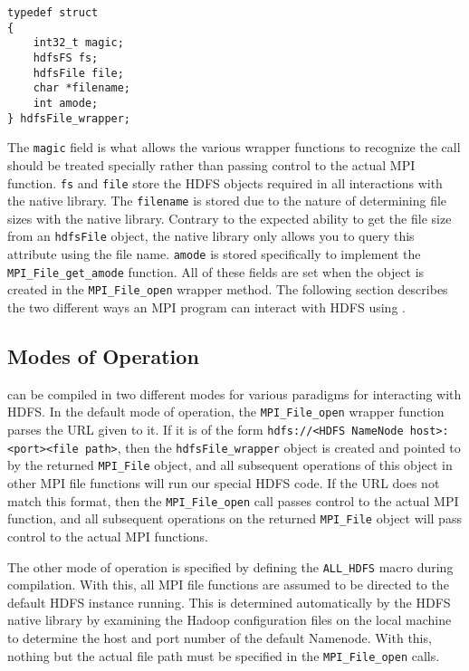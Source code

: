 \begin{lstlisting}
typedef struct
{
	int32_t magic;
	hdfsFS fs;
	hdfsFile file;
	char *filename;
	int amode;
} hdfsFile_wrapper;
\end{lstlisting}

The \texttt{magic} field is what allows the various wrapper functions to
recognize the call should be treated specially rather than passing control to
the actual MPI function. \texttt{fs} and \texttt{file} store the HDFS objects
required in all interactions with the native library. The \texttt{filename} is
stored due to the nature of determining file sizes with the native library.
Contrary to the expected ability to get the file size from an \texttt{hdfsFile}
object, the native library only allows you to query this attribute using the
file name. \texttt{amode} is stored specifically to implement the
\texttt{MPI\_File\_get\_amode} function. All of these fields are set when the
object is created in the \texttt{MPI\_File\_open} wrapper method. The following
section describes the two different ways an MPI program can interact with HDFS using {\proj}.

\subsection{Modes of Operation}
{\proj} can be compiled in two different modes for various paradigms for
interacting with HDFS. In the default mode of operation, the
\texttt{MPI\_File\_open} wrapper function parses the URL given to it. If it is
of the form \texttt{hdfs://<HDFS NameNode host>:<port><file path>}, then the
\texttt{hdfsFile\_wrapper} object is created and pointed to by the returned
\texttt{MPI\_File} object, and all subsequent operations of this object in other
MPI file functions will run our special HDFS code. If the URL does not match
this format, then the \texttt{MPI\_File\_open} call passes control to the actual
MPI function, and all subsequent operations on the returned \texttt{MPI\_File}
object will pass control to the actual MPI functions. 

The other mode of operation is specified by defining the \texttt{ALL\_HDFS} macro during compilation.
With this, all MPI file functions are assumed to be directed to the default HDFS
instance running. This is determined automatically by the HDFS native library by
examining the Hadoop configuration files on the local machine to determine the
host and port number of the default Namenode. With this, nothing but the actual
file path must be specified in the \texttt{MPI\_File\_open} calls. 

